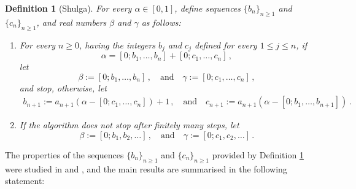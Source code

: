 \documentclass[a4paper,12pt]{article}
\newtheorem{defn}[thm]{Definition}
\def\defeq{:=}
\def\defeq{:=}
\begin{document}
\begin{defn}[Shulga]\label{def:shulga}
For every $\alpha\in[0,1]$, define sequences $\{b_n\}_{n\geq1}$ and $\{c_n\}_{n\geq1}$, and real numbers $\beta$ and $\gamma$ as follows:
\begin{enumerate}%
\item For every $n\geq0$, having the integers $b_j$ and $c_j$ defined for every $1\leq j\leq n$, if 
$$\alpha = [0;b_1,\ldots,b_{n}] + [0;c_1,\ldots,c_{n}]\,,$$ 
let
\begin{equation*}%
    \beta\defeq [0;b_1,\ldots,b_{n}]\,,\quad\textrm{and} \quad \gamma\defeq [0;c_1,\ldots,c_{n}]\,,
\end{equation*}
and stop, otherwise, let
\begin{equation*}
    \begin{aligned}
        b_{n+1}\defeq a_{n+1}(\alpha-[0;c_1,\ldots,c_{n}])+1\,,\quad\textrm{and} \quad
        c_{n+1}\defeq a_{n+1}(\alpha-[0;b_1,\ldots,b_{n+1}])\,.
    \end{aligned}
\end{equation*}
\item If the algorithm does not stop after finitely many steps, let
\begin{equation*}%
    \beta\defeq [0;b_1,b_2,\ldots]\,,\quad \textrm{and} \quad \gamma\defeq [0;c_1,c_2,\ldots]\,.
\end{equation*}
\end{enumerate}
\end{defn}
The properties of the sequences $\{b_n\}_{n\geq1}$ and $\{c_n\}_{n\geq1}$ provided by Definition \ref{def:shulga} were studied in 
\cite{shulga} and 
\cite{GN}, and the main results are summarised in the following statement:
\end{document}
